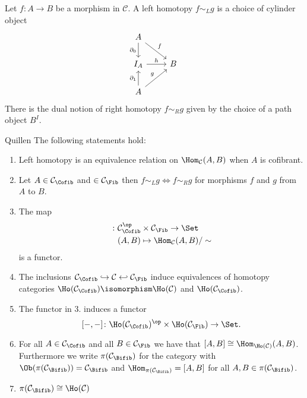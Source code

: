 \begin{defi}
    Let $f\colon A \to B$ be a morphism in $\mathcal{C}$. 
    A left homotopy $f\sim_Lg$ is a choice of cylinder object 
    \[
    \begin{tikzcd}
        A
        \ar[d, "\partial_0"']
        \ar[rd, "f"]
        \\
        I_A
        \ar[r, "h"]
        &
        B
        \\ 
        A
        \ar[u, "\partial_1"]
        \ar[ru, "g"]
    \end{tikzcd}
    \]
    There is the dual notion of right homotopy $f \sim_R g$ given by the choice of a path object $B^I$.
\end{defi}

\begin{thm}{Quillen}
The following statements hold:
    \begin{enumerate}
        \item 
        Left homotopy is an equivalence relation on $\Hom_{\mathcal{C}}(A,B)$ when $A$ is cofibrant.
        \item 
        Let $A \in \mathcal{C}_{\Cofib}$ and $ \in \mathcal{C}_{\Fib}$ then $f \sim_L g \iff f \sim_R g$ for morphisms $f$ and $g$ from $A$ to $B$.
        \item 
        The map 
        \begin{align*}
            [-,-] \colon & \mathcal{C}^{\op}_{\Cofib} \times \mathcal{C}_{\Fib} \to \Set
            \\
            &(A,B) \mapsto \Hom_{\mathcal{C}}(A,B)/\sim
        \end{align*}
        is a functor.
        \item 
        The inclusions $\mathcal{C}_{\Cofib} \hookrightarrow \mathcal{C} \hookleftarrow\mathcal{C}_{\Fib}$ induce equivalences of homotopy categories
        $ \Ho( \mathcal{C}_{\Cofib}) \isomorphism \Ho(\mathcal{C})$ and $\Ho( \mathcal{C}_{\Cofib} )$.
        \item 
        The functor in 3. induces a functor 
        \[
        [-,-]\colon \Ho( \mathcal{C_{\Cofib}})^{\op} \times  \Ho(\mathcal{C}_{\Fib}) \to \Set.
        \]
        \item 
        For all $A \in  \mathcal{C}_{\Cofib}$ and all $B \in \mathcal{C}_{\Fib}$ we have that $[A,B] \cong  \Hom_{\Ho(\mathcal{C})}(A,B)$.
        Furthermore we write $\pi ( \mathcal{C}_{\Bifib})$ for the category with $\Ob(\pi ( \mathcal{C}_{\Bifib}))=\mathcal{C}_{\Bifib}$ and $\Hom_{\pi ( \mathcal{C}_{\Bifib})}=[A,B]$ for all $A,B \in \pi ( \mathcal{C}_{\Bifib})$.
        \item 
        $\pi( \mathcal{C}_{\Bifib}) \cong \Ho(\mathcal{C})$
    \end{enumerate}
\end{thm}

